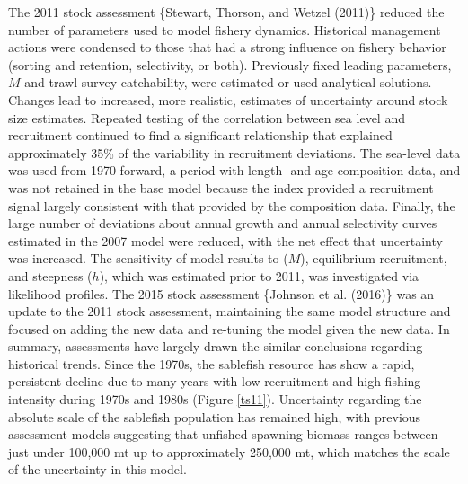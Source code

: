 \documentclass[11pt,
  english,
  a4paper,
]{article}
\begin{document}
\leavevmode\tagmcend\tagstructend\par


The 2011 stock assessment \{{Stewart, Thorson, and Wetzel (2011)\leavevmode\tagmcend\tagstructend}\} reduced the number of parameters used to model fishery dynamics. Historical management actions were condensed to those that had a strong influence on fishery behavior (sorting and retention, selectivity, or both). Previously fixed leading parameters, {\(M\)\leavevmode\tagmcend\tagstructend} and trawl survey catchability, were estimated or used analytical solutions. Changes lead to increased, more realistic, estimates of uncertainty around stock size estimates. Repeated testing of the correlation between sea level and recruitment continued to find a significant relationship that explained approximately 35\% of the variability in recruitment deviations. The sea-level data was used from 1970 forward, a period with length- and age-composition data, and was not retained in the base model because the index provided a recruitment signal largely consistent with that provided by the composition data. Finally, the large number of deviations about annual growth and annual selectivity curves estimated in the 2007 model were reduced, with the net effect that uncertainty was increased. The sensitivity of model results to ({\(M\)\leavevmode\tagmcend\tagstructend}), equilibrium recruitment, and steepness ({\(h\)\leavevmode\tagmcend\tagstructend}), which was estimated prior to 2011, was investigated via likelihood profiles. The 2015 stock assessment \{{Johnson et al. (2016)\leavevmode\tagmcend\tagstructend}\} was an update to the 2011 stock assessment, maintaining the same model structure and focused on adding the new data and re-tuning the model given the new data. In summary, assessments have largely drawn the similar conclusions regarding historical trends. Since the 1970s, the sablefish resource has show a rapid, persistent decline due to many years with low recruitment and high fishing intensity during 1970s and 1980s (Figure \ref{ts11}). Uncertainty regarding the absolute scale of the sablefish population has remained high, with previous assessment models suggesting that unfished spawning biomass ranges between just under 100,000 mt up to approximately 250,000 mt, which matches the scale of the uncertainty in this model.
\end{document}
